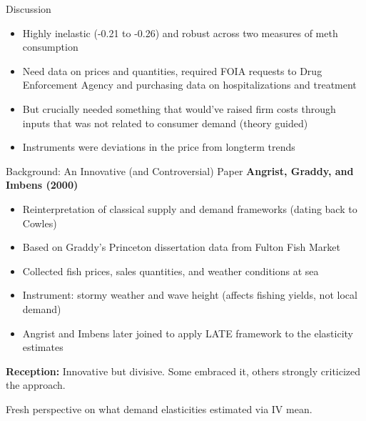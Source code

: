 \documentclass{beamer}
\begin{document}
\begin{frame}{Discussion}

\begin{itemize}
\item Highly inelastic (-0.21 to -0.26) and robust across two measures of meth consumption
\item Need data on prices and quantities, required FOIA requests to Drug Enforcement Agency and purchasing data on hospitalizations and treatment
\item But crucially needed something that would've raised firm costs through inputs that was not related to consumer demand (theory guided)
\item Instruments were deviations in the price from longterm trends
\end{itemize}

\end{frame}


\begin{frame}{Background: An Innovative (and Controversial) Paper}
\textbf{Angrist, Graddy, and Imbens (2000)}
\vspace{0.3cm}

\begin{itemize}
    \item Reinterpretation of classical supply and demand frameworks (dating back to Cowles)
    \item Based on Graddy's Princeton dissertation data from Fulton Fish Market
    \item Collected fish prices, sales quantities, and weather conditions at sea
    \item Instrument: stormy weather and wave height (affects fishing yields, not local demand)
    \item Angrist and Imbens later joined to apply LATE framework to the elasticity estimates
\end{itemize}
\vspace{0.3cm}
\pause
\textbf{Reception:} Innovative but divisive. Some embraced it, others strongly criticized the approach.

\vspace{0.2cm}
Fresh perspective on what demand elasticities estimated via IV mean.
\end{frame}
\end{document}

